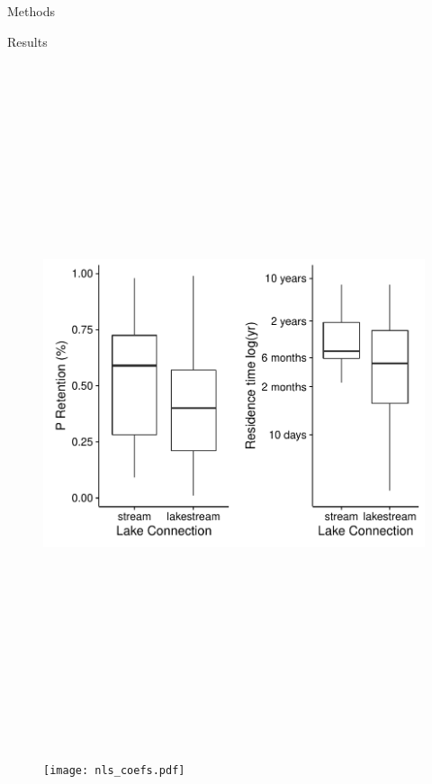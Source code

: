 \documentclass[final,hyperref={pdfpagelabels=false}]{beamer}
\begin{document}
\begin{frame}[t]
\begin{columns}[t]
\begin{column}{.465\textwidth}
\begin{block}{Methods}
\end{block}

\begin{block}{Results}
\begin{figure}
  \includegraphics[width=30cm, height=20cm]{p_retention_boxplot.pdf}
\end{figure}

\begin{figure}
  \texttt{[image: nls\_coefs.pdf]}
\end{figure}

\end{block}


\end{column}
\end{columns}
\end{frame}
\end{document}
